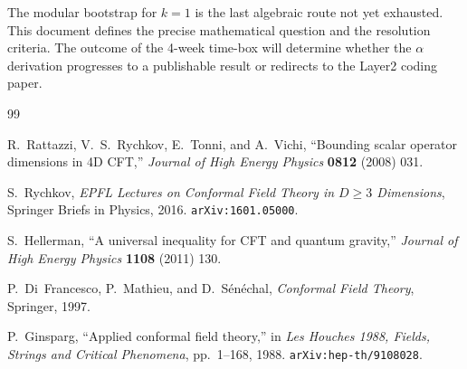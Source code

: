 \documentclass[12pt,a4paper]{article}
\theoremstyle{definition}
\theoremstyle{remark}
\begin{document}
The modular bootstrap for $k=1$ is the last algebraic route not yet exhausted.
This document defines the precise mathematical question and the resolution criteria.
The outcome of the 4-week time-box will determine whether the $\alpha$ derivation
progresses to a publishable result or redirects to the Layer2 coding paper.

\begin{thebibliography}{99}

R.~Rattazzi, V.~S.~Rychkov, E.~Tonni, and A.~Vichi,
``Bounding scalar operator dimensions in 4D CFT,''
\textit{Journal of High Energy Physics} \textbf{0812} (2008) 031.

S.~Rychkov,
\textit{EPFL Lectures on Conformal Field Theory in $D\geq3$ Dimensions},
Springer Briefs in Physics, 2016.
\texttt{arXiv:1601.05000}.

S.~Hellerman,
``A universal inequality for CFT and quantum gravity,''
\textit{Journal of High Energy Physics} \textbf{1108} (2011) 130.

P.~Di~Francesco, P.~Mathieu, and D.~Sénéchal,
\textit{Conformal Field Theory},
Springer, 1997.

P.~Ginsparg,
``Applied conformal field theory,''
in \textit{Les Houches 1988, Fields, Strings and Critical Phenomena},
pp.~1--168, 1988.
\texttt{arXiv:hep-th/9108028}.

\end{thebibliography}
\end{document}
